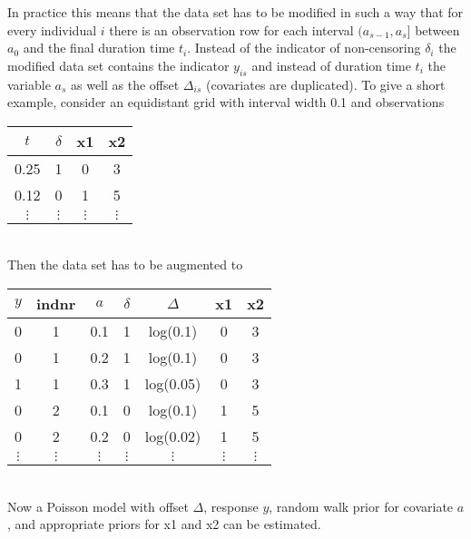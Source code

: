 \documentclass[11pt,a4paper,twoside]{bayesxarticle}
\begin{document}
In practice this means that the data set has to be modified in such
a way that for every individual $i$ there is an observation row for
each interval $(a_{s-1},a_s]$ between $a_0$ and the final duration
time $t_i$. Instead of the indicator of non-censoring $\delta_i$ the
modified data set contains the indicator $y_{is}$ and instead of
duration time $t_i$ the variable $a_s$ as well as the offset
$\Delta_{is}$ (covariates are duplicated). To give a short example,
consider an equidistant grid with interval width 0.1 and
observations
\vspace{0.5cm}\\
\begin{tabular}{c|c|c|c}
  $t$ &   $\delta$ &  x1 &  x2\\\hline\hline
0.25  &  1  &    0  &  3\\\hline 0.12  &  0  &    1  &  5\\\hline
$\vdots$ & $\vdots$ & $\vdots$ & $\vdots$ \\
\end{tabular}
\vspace{0.5cm}\\
Then the data set has to be augmented to
\vspace{0.5cm}\\
\begin{tabular}{c|c|c|c|c|c|c}
$y$ & indnr & $a$& $\delta$ &  $\Delta$ &   x1 & x2\\\hline\hline
0 &  1 &   0.1 &   1  &  log(0.1) & 0  & 3\\
0  & 1   & 0.2  &  1  &  log(0.1) & 0 &  3\\
1  & 1   & 0.3  &  1  &  log(0.05)& 0  & 3\\\hline
0 &  2 &   0.1 &   0 &   log(0.1) & 1 &  5\\
0  & 2  &  0.2 &   0  &  log(0.02)& 1 &  5\\\hline
$\vdots$ & $\vdots$ & $\vdots$ & $\vdots$ & $\vdots$ & $\vdots$& $\vdots$\\
\end{tabular}
\vspace{0.5cm}\\
Now a Poisson model with offset $\Delta$, response $y$, random walk
prior for covariate $a$, and appropriate priors for x1 and x2 can be
estimated.
\end{document}
